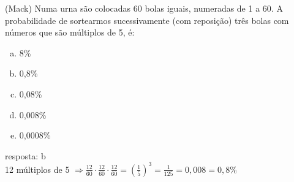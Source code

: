 \begin{ex}
 (Mack) Numa urna são colocadas 60 bolas iguais, numeradas de 1 a 60. A probabilidade de sortearmos sucessivamente (com reposição) três bolas com números que são múltiplos de 5, é:
    \begin{enumerate}[(a)]
    \item 8\%
    \item 0,8\%
    \item 0,08\%
    \item 0,008\%
    \item 0,0008\%
    \end{enumerate}
      \begin{sol}
        resposta: b \\
        12 múltiplos de 5 $\Rightarrow \frac{12}{60}\cdot\frac{12}{60}\cdot\frac{12}{60}=(\frac{1}{5})^3=\frac{1}{125}=0,008=0,8\%$
      \end{sol}
\end{ex}